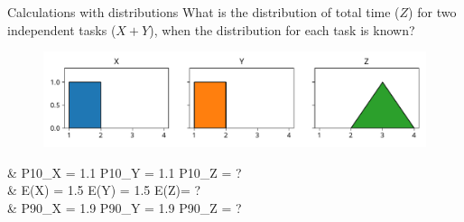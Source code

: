 \documentclass[12pt, aspectratio=149]{beamer}
\theoremstyle{plain}
\begin{document}
\begin{frame}[fragile]{Calculations with distributions}
	What is the distribution of total time ($Z$) for two independent tasks ($X + Y$), when the distribution for each task is known?
    \begin{center}
     \begin{figure}
     	\centering
     	\includegraphics[width=0.99\linewidth]{figures/add_uniform}
     \end{figure}
     \end{center}
	 \begin{flalign*}
     &\hspace*{1em} P10_X = 1.1 \hspace*{4em} P10_Y = 1.1 \hspace*{4em}  P10_Z = ? \\
	 &\hspace*{1em} E(X) = 1.5  \hspace*{4.2em} E(Y) = 1.5  \hspace*{4.3em}  E(Z)= ? \\
     &\hspace*{1em} P90_X = 1.9 \hspace*{4em} P90_Y = 1.9 \hspace*{4em}  P90_Z = ? \\
	\end{flalign*}
\end{frame}
\end{document}
